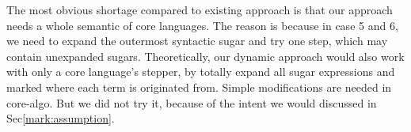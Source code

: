The most obvious shortage compared to existing approach is that our approach needs a whole semantic of core languages. The reason is because in case 5 and 6, we need to expand the outermost syntactic sugar and try one step, which may contain unexpanded sugars. Theoretically, our dynamic approach would also work with only a core language's stepper, by totally expand all sugar expressions and marked where each term is originated from. Simple modifications are needed in core-algo. But we did not try it, because of the intent we would discussed in Sec\ref{mark:assumption}.
